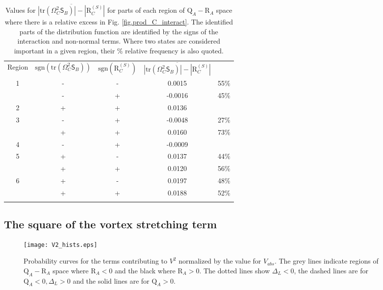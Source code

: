\documentclass[preprint,amssymb,amsmath,aip,cha]{revtex4-1}
\begin{document}
\begin{table}
\caption{Values for $\overline{|\mbox{tr}(\mathsf{\Omega}^{2}_{C}\mathsf{S}_{B})| - |\mbox{R}_{C}^{(S)}|}$ for parts of each region of $\mbox{Q}_{A}-\mbox{R}_{A}$ space where there is a relative excess in Fig. \ref{fig.prod_C_interact}. The identified parts of the distribution function are identified by the signs of the interaction and non-normal terms. Where two states are considered important in a given region, their \% relative frequency is also quoted.}
\centering
\begin{tabular}{ccccl}
\noalign{\smallskip}
Region & $\mbox{sgn}(\mbox{tr}(\mathsf{\Omega}^{2}_{C}\mathsf{S}_{B}))$ & $\mbox{sgn}(\mbox{R}_{C}^{(S)})$ & $\overline{|\mbox{tr}(\mathsf{\Omega}^{2}_{C}\mathsf{S}_{B})| - |\mbox{R}_{C}^{(S)}|}$ & \\
\noalign{\smallskip}%
1 & - & - & 0.0015 & 55\%\\
 & - & + & -0.0016 & 45\%\\
2 & + & + & 0.0136 & \\
3 & - & + & -0.0048 & 27\% \\
 & + & + & 0.0160 & 73\%\\
4 & - & + & -0.0009 & \\
5 & + & - & 0.0137 & 44\%\\
 & + & + & 0.0120 & 56\%\\
6 & + & - & 0.0197 & 48\%\\
 & + & + & 0.0188 & 52\%\\
\noalign{\smallskip}%
\label{table.prod_C_interact}
\end{tabular}
\end{table}

\subsection{The square of the vortex stretching term}

\begin{figure*}
  \texttt{[image: V2\_hists.eps]}
\caption{Probability curves for the terms contributing to $V^{2}$ normalized by the value for $V_{abs}$. The grey lines indicate regions of $\mbox{Q}_{A} - \mbox{R}_{A}$ space where $\mbox{R}_{A} < 0$ and the black where $\mbox{R}_{A} > 0$. The dotted lines show $\Delta_{L} < 0$, the dashed lines are for $\mbox{Q}_{A} < 0, \Delta_{L} > 0$ and the solid lines are for $\mbox{Q}_{A} > 0$.}
\label{fig:V2hists}       %
\end{figure*}
\end{document}
